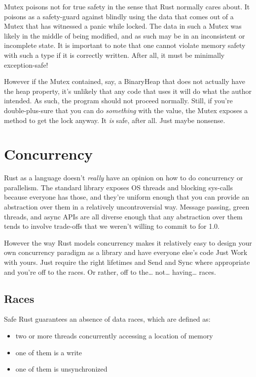 \documentclass[a4paper,]{book}
\providecommand{\tightlist}{%
  \setlength{\itemsep}{0pt}\setlength{\parskip}{0pt}}
\begin{document}
Mutex poisons not for true safety in the sense that Rust normally cares
about. It poisons as a safety-guard against blindly using the data that
comes out of a Mutex that has witnessed a panic while locked. The data
in such a Mutex was likely in the middle of being modified, and as such
may be in an inconsistent or incomplete state. It is important to note
that one cannot violate memory safety with such a type if it is
correctly written. After all, it must be minimally exception-safe!

However if the Mutex contained, say, a BinaryHeap that does not actually
have the heap property, it's unlikely that any code that uses it will do
what the author intended. As such, the program should not proceed
normally. Still, if you're double-plus-sure that you can do
\emph{something} with the value, the Mutex exposes a method to get the
lock anyway. It \emph{is} safe, after all. Just maybe nonsense.

\chapter{Concurrency}\label{sec--concurrency}

Rust as a language doesn't \emph{really} have an opinion on how to do
concurrency or parallelism. The standard library exposes OS threads and
blocking sys-calls because everyone has those, and they're uniform
enough that you can provide an abstraction over them in a relatively
uncontroversial way. Message passing, green threads, and async APIs are
all diverse enough that any abstraction over them tends to involve
trade-offs that we weren't willing to commit to for 1.0.

However the way Rust models concurrency makes it relatively easy to
design your own concurrency paradigm as a library and have everyone
else's code Just Work with yours. Just require the right lifetimes and
Send and Sync where appropriate and you're off to the races. Or rather,
off to the\ldots{} not\ldots{} having\ldots{} races.

\hypertarget{sec--races}{\section{Races}\label{sec--races}}

Safe Rust guarantees an absence of data races, which are defined as:

\begin{itemize}
\tightlist
\item
  two or more threads concurrently accessing a location of memory
\item
  one of them is a write
\item
  one of them is unsynchronized
\end{itemize}
\end{document}
